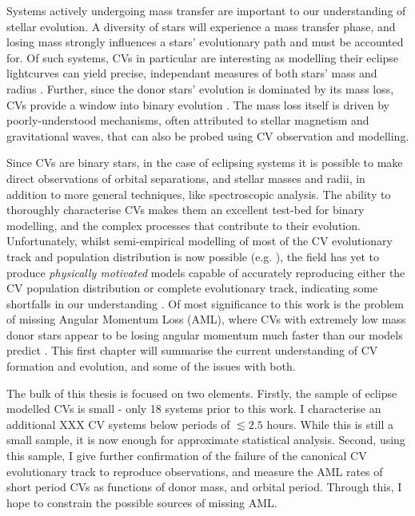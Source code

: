 Systems actively undergoing mass transfer are important to our understanding of stellar evolution. A diversity of stars will experience a mass transfer phase, and losing mass strongly influences a stars' evolutionary path and must be accounted for. Of such systems, CVs in particular are interesting as modelling their eclipse lightcurves can yield precise, independant measures of both stars' mass and radius \citep{wood1986,Littlefair2008,Savoury2011}. Further, since the donor stars' evolution is dominated by its mass loss, CVs provide a window into binary evolution \citep{knigge2006}.
The mass loss itself is driven by poorly-understood mechanisms, often attributed to stellar magnetism and gravitational waves, that can also be probed using CV observation and modelling.

Since CVs are binary stars, in the case of eclipsing systems it is possible to make direct observations of orbital separations, and stellar masses and radii, in addition to more general techniques, like spectroscopic analysis.
The ability to thoroughly characterise CVs makes them an excellent test-bed for binary modelling, and the complex processes that contribute to their evolution.
Unfortunately, whilst semi-empirical modelling of most of the CV evolutionary track and population distribution is now possible (e.g. \citealt{knigge11,Paxton_2015}), the field has yet to produce {\it physically motivated} models capable of accurately reproducing either the CV population distribution or complete evolutionary track, indicating some shortfalls in our understanding \citep{schreiber2015,Schreiber2016}. Of most significance to this work is the problem of missing Angular Momentum Loss (AML), where CVs with extremely low mass donor stars appear to be losing angular momentum much faster than our models predict \citep{wild2021}. This first chapter will summarise the current understanding of CV formation and evolution, and some of the issues with both.

The bulk of this thesis is focused on two elements. Firstly, the sample of eclipse modelled CVs is small - only 18 systems prior to this work. 
I characterise an additional XXX CV systems below periods of $\lesssim 2.5$ hours.
While this is still a small sample, it is now enough for approximate statistical analysis.
Second, using this sample, I give further confirmation of the failure of the canonical CV evolutionary track to reproduce observations, and measure the AML rates of short period CVs as functions of donor mass, and orbital period. Through this, I hope to constrain the possible sources of missing AML.



